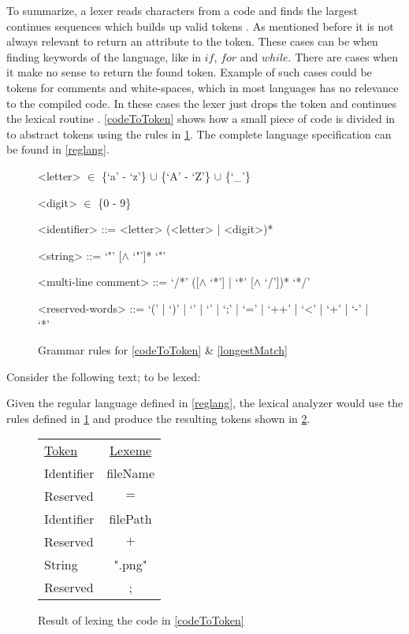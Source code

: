 To summarize, a lexer reads characters from a code and finds the largest 
continues sequences which builds up valid tokens \cite{sebesta2012}. As 
mentioned before it is not always relevant to return an attribute to the token. 
These cases can be when finding keywords of the language, like in $if$, $for$
and $while$. There are cases when it make no sense to return the found token.
Example of such cases could be tokens for comments and white-spaces, which in 
most languages has no relevance to the compiled code. In these cases the lexer 
just drops the token and continues the lexical routine \cite{Aho2006}.
\cref{codeToToken} shows how a small piece of code is divided in to abstract
tokens using the rules in \cref{fig:grammar}. The complete language specification
can be found in \cref{reglang}.

\begin{figure}[h!]
\begin{addmargin}[2em]{0em}
\begin{grammar}

<letter>  $\in$ \{`a' - `z'\} $\cup$ \{`A' - `Z'\} $\cup$ \{`_'\}

<digit>  $\in$ \{0 - 9\}

<identifier> ::= <letter> (<letter> | <digit>)* 

<string> ::= `"' [$\wedge$ `"']* `"'

<multi-line comment> ::= `/*' ([$\wedge$ `*'] | `*' [$\wedge$ `/'])* `*/'

<reserved-words> ::= `(' | `)' | `{' | `}' | `;' | `=' | `++' | `<' | `+' | `-' | `*'

\end{grammar}
\end{addmargin}
\caption{Grammar rules for \cref{codeToToken} \& \cref{longestMatch}\label{fig:grammar}}
\end{figure}

\begin{example} \label{codeToToken}$ $\\
Consider the following text; to be lexed:

Given the regular language defined in \cref{reglang}, the lexical analyzer would
use the rules defined in \cref{fig:grammar} and produce the resulting
tokens shown in \cref{fig:codeToToken}.

\begin{figure}[h!]
\begin{center}
\begin{tabular}{l c}
\underline{Token} & \underline{Lexeme}\\
Identifier & fileName\\
Reserved & $=$\\
Identifier & filePath\\
Reserved & $+$\\
String & ".png"\\
Reserved & ;
\end{tabular}
\end{center}
\caption{Result of lexing the code in \cref{codeToToken} \label{fig:codeToToken}}
\end{figure}
\end{example}

